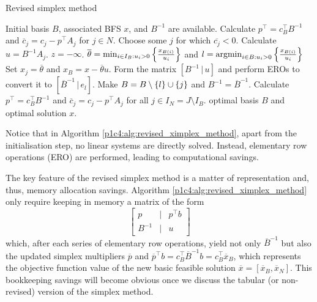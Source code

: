 \begin{algorithm}[h]
	\caption{Revised simplex method} \label{p1c4:alg:revised_ximplex_method}
	\begin{algorithmic}[1] %
	 Initial basis $B$, associated BFS $x$, and $B^{-1}$ are available.
	\State Calculate $p^\top = c_B^\top B^{-1}$ and $\overline{c}_j = c_j - p^\top A_j$ for $j \in N$.
	 \label{p1c4:alg:opt_condition} 
	    \State Choose some $j$ for which $\overline{c_j} < 0$. Calculate $u = B^{-1}A_j$. 
	     \label{p1c4:alg:unb_condition}
			 $z = -\infty$.		
		\Else
			\State $\overline{\theta} = \min_{i \in I_B : u_i > 0} \left\{ \frac{x_{B(i)}}{u_i} \right \}$ and $l = \mathop{\rm argmin}_{i \in B : u_i > 0} \left\{ \frac{x_{B(i)}}{u_i} \right \}$ 
			\State Set $x_j = \overline{\theta}$ and $x_B = x - \overline{\theta}u$.
			\State Form the matrix $[B^{-1} \,|\, u]$ and perform EROs to convert it to $[\overline{B}^{-1} \, | \, e_l]$. 
			\State Make $B = B \setminus \left\{ l \right \} \cup \left\{ j \right \}$ and $B^{-1} = \overline{B}^{-1}$. 
			\State Calculate $p^\top = c_B^\top B^{-1}$ and $\overline{c}_j = c_j - p^\top A_j$ for all $j \in I_N = J \setminus I_B$.
		\EndIf
	\EndWhile
	 optimal basis $B$ and optimal solution $x$.
	\end{algorithmic}
\end{algorithm}

Notice that in Algorithm \ref{p1c4:alg:revised_ximplex_method}, apart from the initialisation step, no linear systems are directly solved. Instead, elementary row operations (ERO) are performed, leading to computational savings.

The key feature of the revised simplex method is a matter of representation and, thus, memory allocation savings. Algorithm \ref{p1c4:alg:revised_ximplex_method} only require keeping in memory a matrix of the form 
%
\begin{equation*}
	\begin{bmatrix}
		p & | & p^\top b \\
		B^{-1} & | & u	
	\end{bmatrix}
\end{equation*}
%  
which, after each series of elementary row operations, yield not only $\overline{B}^{-1}$ but also the updated simplex multipliers $\overline{p}$ and $\overline{p}^\top b = c_B^\top \overline{B}^{-1}b = c_B ^\top \overline{x}_B$, which represents the objective function value of the new basic feasible solution $\overline{x} = [\overline{x}_B, \overline{x}_N]$. This bookkeeping savings will become obvious once we discuss the tabular (or non-revised) version of the simplex method. 

